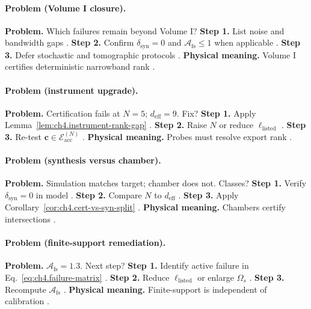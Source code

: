 \paragraph{Problem (Volume I closure).}
\textbf{Problem.} Which failures remain beyond Volume I?
\textbf{Step 1.} List noise and bandwidth gaps \cite{harrington2001,devaney2004}.
\textbf{Step 2.} Confirm \(\delta_{\mathrm{syn}}=0\) and \(\mathcal{A}_{\mathrm{fs}}\le1\) when applicable \cite{hansen1988,stratton1941}.
\textbf{Step 3.} Defer stochastic and tomographic protocols \cite{jackson1999}.
\textbf{Physical meaning.} Volume I certifies deterministic narrowband rank \cite{stratton1941,harrington2001}.

\paragraph{Problem (instrument upgrade).}
\textbf{Problem.} Certification fails at \(N=5\); \(d_{\mathrm{eff}}=9\). Fix?
\textbf{Step 1.} Apply Lemma~\ref{lem:ch4.instrument-rank-gap} \cite{harrington2001,devaney2004}.
\textbf{Step 2.} Raise \(N\) or reduce \(\ell_{\mathrm{listed}}\) \cite{hansen1988,stratton1941}.
\textbf{Step 3.} Re-test \(\mathbf{c}\in\mathcal{E}_{\mathrm{acc}}^{(N)}\) \cite{jackson1999,collin2001}.
\textbf{Physical meaning.} Probes must resolve export rank \cite{harrington2001}.

\paragraph{Problem (synthesis versus chamber).}
\textbf{Problem.} Simulation matches target; chamber does not. Classes?
\textbf{Step 1.} Verify \(\delta_{\mathrm{syn}}=0\) in model \cite{stratton1941,harrington2001}.
\textbf{Step 2.} Compare \(N\) to \(d_{\mathrm{eff}}\) \cite{hansen1988,devaney2004}.
\textbf{Step 3.} Apply Corollary~\ref{cor:ch4.cert-vs-syn-split} \cite{jackson1999}.
\textbf{Physical meaning.} Chambers certify intersections \cite{stratton1941,collin2001}.

\paragraph{Problem (finite-support remediation).}
\textbf{Problem.} \(\mathcal{A}_{\mathrm{fs}}=1.3\). Next step?
\textbf{Step 1.} Identify active failure in Eq.~\eqref{eq:ch4.failure-matrix} \cite{hansen1988,stratton1941}.
\textbf{Step 2.} Reduce \(\ell_{\mathrm{listed}}\) or enlarge \(\Omega_{s}\) \cite{harrington2001,devaney2004}.
\textbf{Step 3.} Recompute \(\mathcal{A}_{\mathrm{fs}}\) \cite{jackson1999}.
\textbf{Physical meaning.} Finite-support is independent of calibration \cite{stratton1941}.

